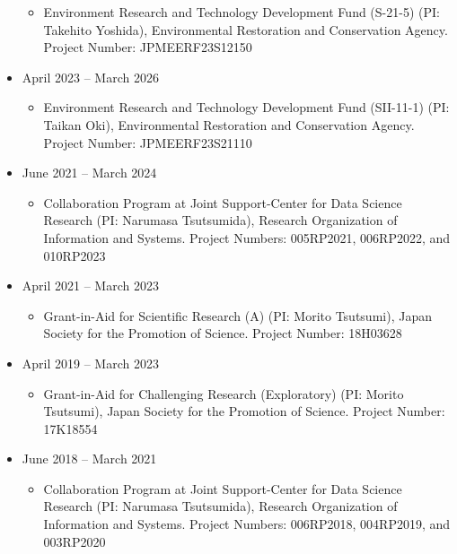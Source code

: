 \documentclass[
]{book}
\providecommand{\tightlist}{%
  \setlength{\itemsep}{0pt}\setlength{\parskip}{0pt}}
\begin{document}
\begin{itemize}
  \begin{itemize}
  \tightlist
  \item
    Environment Research and Technology Development Fund (S-21-5) (PI: Takehito Yoshida),
    Environmental Restoration and Conservation Agency.
    Project Number: JPMEERF23S12150
  \end{itemize}
\item
  April 2023 -- March 2026

  \begin{itemize}
  \tightlist
  \item
    Environment Research and Technology Development Fund (SII-11-1) (PI: Taikan Oki),
    Environmental Restoration and Conservation Agency.
    Project Number: JPMEERF23S21110
  \end{itemize}
\item
  June 2021 -- March 2024

  \begin{itemize}
  \tightlist
  \item
    Collaboration Program at Joint Support-Center for Data Science Research (PI: Narumasa Tsutsumida),
    Research Organization of Information and Systems.
    Project Numbers: 005RP2021, 006RP2022, and 010RP2023
  \end{itemize}
\item
  April 2021 -- March 2023

  \begin{itemize}
  \tightlist
  \item
    Grant-in-Aid for Scientific Research (A) (PI: Morito Tsutsumi),
    Japan Society for the Promotion of Science.
    Project Number: 18H03628
  \end{itemize}
\item
  April 2019 -- March 2023

  \begin{itemize}
  \tightlist
  \item
    Grant-in-Aid for Challenging Research (Exploratory) (PI: Morito Tsutsumi),
    Japan Society for the Promotion of Science.
    Project Number: 17K18554
  \end{itemize}
\item
  June 2018 -- March 2021

  \begin{itemize}
  \tightlist
  \item
    Collaboration Program at Joint Support-Center for Data Science Research (PI: Narumasa Tsutsumida),
    Research Organization of Information and Systems.
    Project Numbers: 006RP2018, 004RP2019, and 003RP2020
  \end{itemize}
\end{itemize}
\end{document}
